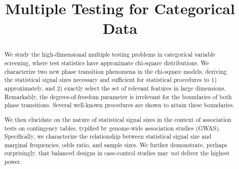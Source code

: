 \documentclass[ejs]{imsart}
\numberwithin{equation}{section}
\theoremstyle{plain}
\theoremstyle{remark}
\begin{document}
\begin{frontmatter}
\title{Multiple Testing for Categorical Data}%

\begin{aug}
\author{ }

\address{Department of Statistics, University of Michigan, Ann Arbor, USA\\
}



\end{aug}

\begin{abstract}
We study the high-dimensional multiple testing problems in categorical variable screening, where test statistics have approximate chi-square distributions.
We characterize two new phase transition phenomena in the chi-square models, deriving the statistical signal sizes necessary and sufficient for statistical procedures to 1) approximately, and 2) exactly select the set of relevant features in large dimensions.
Remarkably, the degrees-of-freedom parameter is irrelevant for the boundaries of both phase transitions.
Several well-known procedures are shown to attain these boundaries.

We then elucidate on the nature of statistical signal sizes in the context of association tests on contingency tables, typified by genome-wide association studies (GWAS). 
Specifically, we characterize the relationship between statistical signal size and marginal frequencies, odds ratio, and sample sizes. %
We further demonstrate, perhaps surprisingly, that balanced designs in case-control studies may \emph{not} deliver the highest power. %


\end{abstract}
\end{frontmatter}
\end{document}
